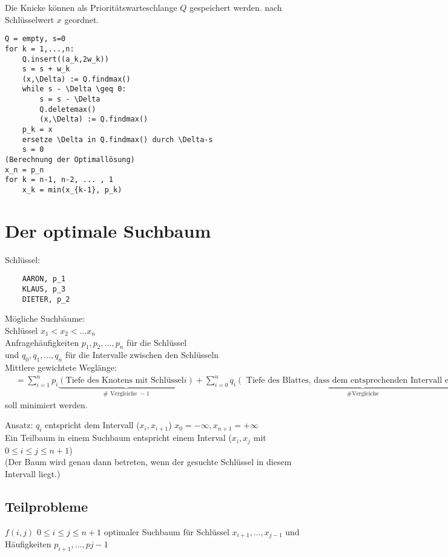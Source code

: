 Die Knicke können als Prioritätswarteschlange $Q$ gespeichert werden. nach Schlüsselwert $x$ geordnet.

\begin{lstlisting}
Q = empty, s=0
for k = 1,...,n:
	Q.insert((a_k,2w_k))
	s = s + w_k
	(x,\Delta) := Q.findmax()
	while s - \Delta \geq 0:
		s = s - \Delta
		Q.deletemax()
		(x,\Delta) := Q.findmax()
	p_k = x
	ersetze \Delta in Q.findmax() durch \Delta-s
	s = 0
(Berechnung der Optimallösung)
x_n = p_n
for k = n-1, n-2, ... , 1
	x_k = min(x_{k-1}, p_k)
\end{lstlisting}
\section{Der optimale Suchbaum}
Schlüssel:
\begin{lstlisting}
	AARON, p_1
	KLAUS, p_3
	DIETER, p_2
\end{lstlisting}
Mögliche Suchbäume:\\


Schlüssel $x_1 < x_2 < ... x_n$\\
Anfragehäufigkeiten $p_1, p_2, ... ,p_n$ für die Schlüssel\\
und $q_0,q_1, ... , q_n$ für die Intervalle zwischen den Schlüsseln\\

Mittlere gewichtete Weglänge:
\begin{align*}
&= \sum_{i=1}^n p_i \underbrace{(\text{Tiefe des Knotens mit Schlüssel}  i)}_{\# \text{ Vergleiche } -1} + \sum_{i=0}^n q_i \underbrace{(\text{ Tiefe des Blattes, dass dem entsprechenden Intervall entspricht})}_{\#\text{Vergleiche}}
\end{align*}
soll minimiert werden.

Ansatz: $q_i$ entspricht dem Intervall ($x_i, x_{i+1}$) $x_0 = -\infty, x_{n+1} = +\infty$\\
Ein Teilbaum in einem Suchbaum entspricht einem Interval ($x_i, x_j$ mit $0\leq i \leq j \leq n+1$)\\
(Der Baum wird genau dann betreten, wenn der gesuchte Schlüssel in diesem Intervall liegt.)\\

\subsection{Teilprobleme}
 $f(i,j)$ $0\leq i \leq j \leq n+1$ optimaler Suchbaum für Schlüssel $x_{i+1}, ... , x_{j-1}$ und Häufigkeiten $p_{i+1},...,p{j-1}$\\
 
